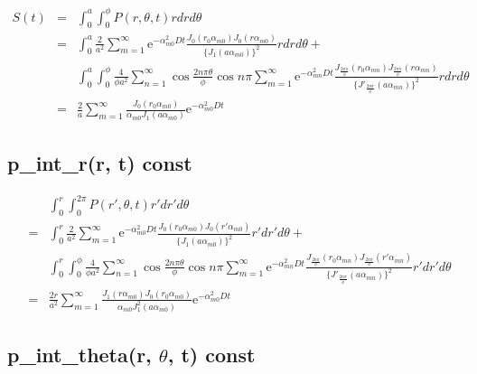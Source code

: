 \documentclass{article}
\begin{document}
\begin{eqnarray}
    S(t) &=& \int^a_0 \int^{\phi}_0 P(r, \theta, t) rdrd\theta \nonumber \\
         &=& \int^a_0 \frac{2}{a^2} \sum^{\infty}_{m=1}
             \mathrm{e}^{-\alpha_{m0}^2Dt}
             \frac{J_0(r_0\alpha_{m0})
                   J_0(r\alpha_{m0})}
                  {\{J_1(a\alpha_{m0})\}^2}rdrd\theta+\nonumber\\
         & & \int^a_0\int^\phi_0
             \frac{4}{\phi a^2}\sum^{\infty}_{n=1}
             \cos\frac{2n\pi\theta}{\phi}\cos n\pi
             \sum^{\infty}_{m=1}
             \mathrm{e}^{-\alpha_{mn}^2Dt}
             \frac{J_{\frac{2n\pi}{\phi}}(r_0\alpha_{mn})
                   J_{\frac{2n\pi}{\phi}}(r\alpha_{mn})}
                  {\{J'_{\frac{2n\pi}{\phi}}(a\alpha_{mn})\}^2}
             rdrd\theta\nonumber\\
         &=& \frac{2}{a} \sum^{\infty}_{m=1}
             \frac{J_0(r_0\alpha_{m0})}{\alpha_{m0} J_1(a\alpha_{m0})}
             \mathrm{e}^{-\alpha^2_{m0}Dt} \nonumber
\end{eqnarray}

\subsection{p\_int\_r(r, t) const}

\begin{eqnarray}
    & & \int^r_0 \int^{2\pi}_0 P(r', \theta, t) r'dr'd\theta \nonumber \\
    &=& \int^r_0 \frac{2}{a^2} \sum^{\infty}_{m=1}
        \mathrm{e}^{-\alpha_{m0}^2Dt}
        \frac{J_0(r_0\alpha_{m0})
              J_0(r'\alpha_{m0})}
             {\{J_1(a\alpha_{m0})\}^2} r'dr'd\theta+\nonumber\\
    & & \int^r_0\int^\phi_0
        \frac{4}{\phi a^2}\sum^{\infty}_{n=1}
        \cos\frac{2n\pi\theta}{\phi}\cos n\pi
        \sum^{\infty}_{m=1}
        \mathrm{e}^{-\alpha_{mn}^2Dt}
        \frac{J_{\frac{2n\pi}{\phi}}(r_0\alpha_{mn})
              J_{\frac{2n\pi}{\phi}}(r'\alpha_{mn})}
             {\{J'_{\frac{2n\pi}{\phi}}(a\alpha_{mn})\}^2}
        r'dr'd\theta\nonumber\\
    &=& \frac{2r}{a^2}\sum^\infty_{m=1}
        \frac{J_1(r\alpha_{m0})J_0(r_0\alpha_{m0})}
             {\alpha_{m0}J^2_1(a\alpha_{m0})}
        \mathrm{e}^{-\alpha^2_{m0}Dt}\nonumber
\end{eqnarray}

\subsection{p\_int\_theta(r, $\theta$, t) const}
\end{document}
